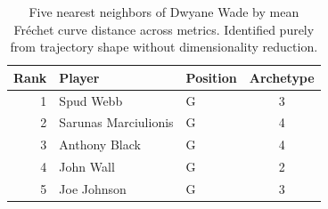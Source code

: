 \begin{table}[htbp]
  \centering\small
  \begin{tabular}{rllc}
    \toprule
    Rank & Player & Position & Archetype \\
    \midrule
    1 & Spud Webb & G & 3 \\
    2 & Sarunas Marciulionis & G & 4 \\
    3 & Anthony Black & G & 4 \\
    4 & John Wall & G & 2 \\
    5 & Joe Johnson & G & 3 \\
    \bottomrule
  \end{tabular}
  \caption{Five nearest neighbors of Dwyane Wade by mean Fr\'{e}chet curve distance across metrics. Identified purely from trajectory shape without dimensionality reduction.}
  \label{tab:Dwyane_Wade_frechet_curve_neighbors}
\end{table}

